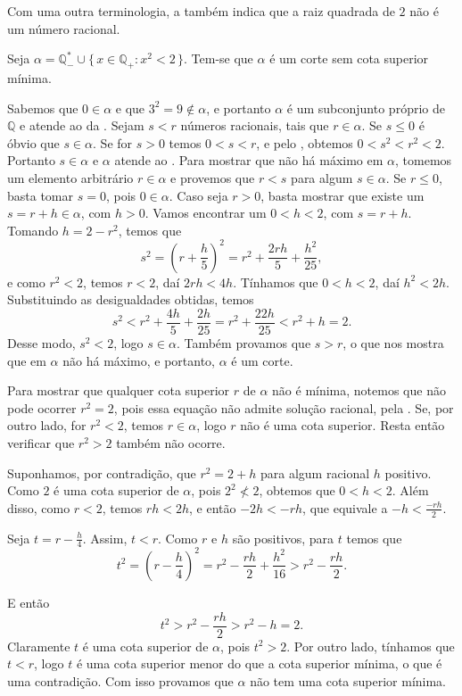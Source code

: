\documentclass[../main.tex]{subfiles}
\begin{document}
\begin{obs}
    Com uma outra terminologia, a  também indica que a raiz quadrada de $2$ não é um número racional.
\end{obs}

\begin{prop}\label{reais-prop-corteRaizDoisNaoRacional}
    Seja $\alpha = \mathbb{Q}_{-}^* \cup \{\, x \in \mathbb{Q}_{+} : x^2 < 2 \,\}$. Tem-se que $\alpha$ é um corte sem cota superior mínima.
\end{prop}
\begin{dem}
   Sabemos que $0 \in \alpha$ e que $3^2 = 9 \not\in \alpha$, e portanto $\alpha$ é um subconjunto próprio de $\mathbb{Q}$ e atende ao  da . 
   Sejam $s < r$ números racionais, tais que $r \in \alpha$. Se $s \leq 0$ é óbvio que $s \in \alpha$. Se for $s > 0$ temos $0 < s < r$, e pelo
   , obtemos $0 < s^2 < r^2 < 2$. Portanto $s \in \alpha$ e $\alpha$ atende ao .
   Para mostrar que não há máximo em $\alpha$, tomemos um elemento arbitrário $r \in \alpha$ e provemos que $r < s$ para algum $s \in \alpha$. Se $r \leq 0$, basta tomar $s = 0$, pois $0 \in \alpha$. Caso seja $r > 0$, basta mostrar que existe um $s = r + h \in \alpha$, com $h > 0$. Vamos encontrar um $0 < h < 2$, com $s=r+h$. 
   Tomando $h = 2 - r^2$, temos que
   \[ s^2 = \left( r+ \frac{h}{5} \right)^2 = r^2 + \frac{2rh}{5}+ \frac{h^2}{25}, \]
    e como $r^2 < 2$, temos $r<2$, daí $2rh < 4h$. Tínhamos que $0 < h < 2$, daí $h^2 < 2h$. Substituindo as desigualdades obtidas, temos
    \[ s^2 < r^2 + \frac{4h}{5} + \frac{2h}{25}  = r^2 + \frac{22h}{25} < r^2 + h = 2. \]
    Desse modo, $s^2 < 2$, logo $s \in \alpha$. Também provamos que $s>r$, o que nos mostra que em $\alpha$ não há máximo, e portanto, $\alpha$ é um corte.

    Para mostrar que qualquer cota superior $r$ de $\alpha$ não é mínima, notemos que não pode ocorrer $r^2 = 2$, pois essa equação não admite solução racional, pela . Se, por outro lado, for $r^2<2$, temos $r \in \alpha$, logo $r$ não é uma cota superior. Resta então verificar que $r^2 > 2$ também não ocorre. 

    Suponhamos, por contradição, que $r^2 = 2+ h$ para algum racional $h$ positivo. Como $2$ é uma cota superior de $\alpha$, pois $2^2 \not< 2$, obtemos que $0 < h < 2$. Além disso, como $r < 2$, temos $rh < 2h$, e então $-2h < -rh$, que equivale a $-h < \frac{-rh}{2}$.
    
    Seja $t = r - \frac{h}{4}$. Assim, $t < r$. Como $r$ e $h$ são positivos, para $t$ temos que
    \[ t^2 = \left( r - \frac{h}{4} \right)^2 = r^2 - \frac{rh}{2} + \frac{h^2}{16} > r^2 - \frac{rh}{2}. \]

    E então
    \[ t^2 > r^2 - \frac{rh}{2} > r^2-h = 2. \]
    Claramente $t$ é uma cota superior de $\alpha$, pois $t^2 >  2$. Por outro lado, tínhamos que $t < r$, logo $t$ é uma cota superior menor do que a cota superior mínima, o que é uma contradição. Com isso provamos que $\alpha$ não tem uma cota superior mínima. 
\end{dem}
\end{document}
